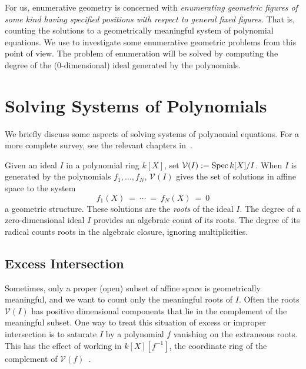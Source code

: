 For us, enumerative geometry is concerned
with {\sl enumerating geometric figures of some kind having
specified positions with respect to general fixed figures}.
That is, counting the solutions to a geometrically meaningful
system of polynomial equations.
We use \Mtwo{}\/ to investigate some enumerative geometric
problems from this point of view.
The problem of enumeration will be solved by computing the
degree of the 
(0-dimensional) ideal generated by the polynomials.

\section{Solving Systems of Polynomials}
We briefly discuss some aspects of solving systems of polynomial
equations.
For a more complete survey, see the relevant chapters
in~\cite{SO:CCS,SO:CLO92}.

Given an ideal $I$ in a polynomial ring $k[X]$, set 
${\mathcal V}(I):= {\rm Spec}\,k[X]/I$.
When $I$ is generated by the polynomials
$f_1,\ldots,f_N$, ${\mathcal V}(I)$ gives the set of solutions in affine 
space to the system 
\begin{equation}\label{eq:system}
  f_1(X)\ =\ \cdots\ =\ f_N(X)\ =\ 0
\end{equation}
a geometric structure.
These solutions are the {\it roots} of the ideal $I$.
The degree of a zero-dimensional ideal $I$ provides an algebraic count of
its roots.
The degree of its radical counts 
roots in the algebraic closure, ignoring multiplicities.
          
\subsection{Excess Intersection}
Sometimes, only a proper (open) subset of affine space is 
geometrically meaningful, and we want to count only the meaningful roots of
$I$. 
Often the roots ${\mathcal V}(I)$ has positive dimensional components that lie
in the complement of the meaningful subset.
One way to treat this situation of excess or improper intersection is to
saturate $I$ by a polynomial $f$ vanishing on the extraneous
roots. 
This has the effect of working in $k[X][f^{-1}]$, the coordinate ring of the
complement of ${\mathcal V}(f)$~\cite[Exer.~2.3]{SO:MR97a:13001}.

